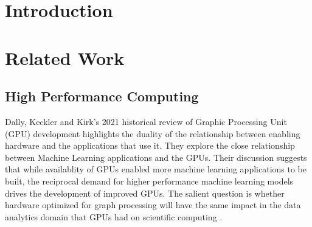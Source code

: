 \documentclass[sigconf,authordraft]{acmart}
\begin{document}
\section{Introduction}


\section{Related Work}

\subsection{High Performance Computing}
\par{Dally, Keckler and Kirk's 2021 historical review of Graphic Processing Unit (GPU) development highlights the duality of the relationship between enabling hardware and the applications that use it. 
They explore the close relationship between Machine Learning applications and the GPUs. Their discussion suggests that while availablity of GPUs enabled more machine learning applications to be built, the reciprocal demand for higher performance machine learning models drives the development of improved GPUs. 
The salient question is whether hardware optimized for graph processing will have the same impact in the data analytics domain that GPUs had on scientific computing \cite{Dally2021}.}
\end{document}
